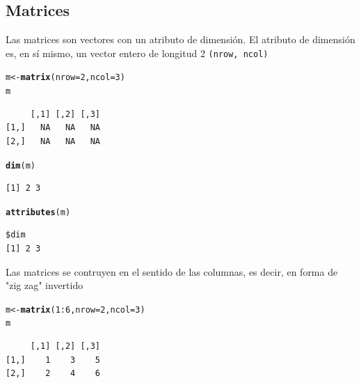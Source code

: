 \documentclass{article}\usepackage[]{graphicx}\usepackage[]{color}
\makeatletter
\newcommand{\hlnum}[1]{\textcolor[rgb]{0.686,0.059,0.569}{#1}}%
\newcommand{\hlopt}[1]{\textcolor[rgb]{0,0,0}{#1}}%
\newcommand{\hlstd}[1]{\textcolor[rgb]{0.345,0.345,0.345}{#1}}%
\newcommand{\hlkwb}[1]{\textcolor[rgb]{0.69,0.353,0.396}{#1}}%
\newcommand{\hlkwc}[1]{\textcolor[rgb]{0.333,0.667,0.333}{#1}}%
\newcommand{\hlkwd}[1]{\textcolor[rgb]{0.737,0.353,0.396}{\textbf{#1}}}%
\newenvironment{kframe}{%
 \def\at@end@of@kframe{}%
 \ifinner\ifhmode%
  \def\at@end@of@kframe{\end{minipage}}%
  \begin{minipage}{\columnwidth}%
 \fi\fi%
 \def\FrameCommand##1{\hskip\@totalleftmargin \hskip-\fboxsep
 \colorbox{shadecolor}{##1}\hskip-\fboxsep
     \hskip-\linewidth \hskip-\@totalleftmargin \hskip\columnwidth}%
 \MakeFramed {\advance\hsize-\width
   \@totalleftmargin\z@ \linewidth\hsize
   \@setminipage}}%
 {\par\unskip\endMakeFramed%
 \at@end@of@kframe}
\newenvironment{knitrout}{}{} %
\makeatother
\begin{document}
  \subsection{Matrices}
    Las matrices son vectores con un atributo de dimensión. El atributo de dimensión es, en sí mismo, un vector entero de longitud 2 \texttt{(nrow, ncol)}
\begin{knitrout}
\color{fgcolor}\begin{kframe}
\begin{alltt}
  \hlstd{m} \hlkwb{<-} \hlkwd{matrix}\hlstd{(}\hlkwc{nrow} \hlstd{=} \hlnum{2}\hlstd{,} \hlkwc{ncol} \hlstd{=} \hlnum{3}\hlstd{)}
  \hlstd{m}
\end{alltt}
\begin{verbatim}
     [,1] [,2] [,3]
[1,]   NA   NA   NA
[2,]   NA   NA   NA
\end{verbatim}
\begin{alltt}
  \hlkwd{dim}\hlstd{(m)}
\end{alltt}
\begin{verbatim}
[1] 2 3
\end{verbatim}
\begin{alltt}
  \hlkwd{attributes}\hlstd{(m)}
\end{alltt}
\begin{verbatim}
$dim
[1] 2 3
\end{verbatim}
\end{kframe}
\end{knitrout}

    Las matrices se contruyen en el sentido de las columnas, es decir, en forma de "zig zag" invertido
\begin{knitrout}
\color{fgcolor}\begin{kframe}
\begin{alltt}
  \hlstd{m} \hlkwb{<-} \hlkwd{matrix}\hlstd{(}\hlnum{1}\hlopt{:}\hlnum{6}\hlstd{,} \hlkwc{nrow} \hlstd{=} \hlnum{2}\hlstd{,} \hlkwc{ncol} \hlstd{=} \hlnum{3}\hlstd{)}
  \hlstd{m}
\end{alltt}
\begin{verbatim}
     [,1] [,2] [,3]
[1,]    1    3    5
[2,]    2    4    6
\end{verbatim}
\end{kframe}
\end{knitrout}
\end{document}
